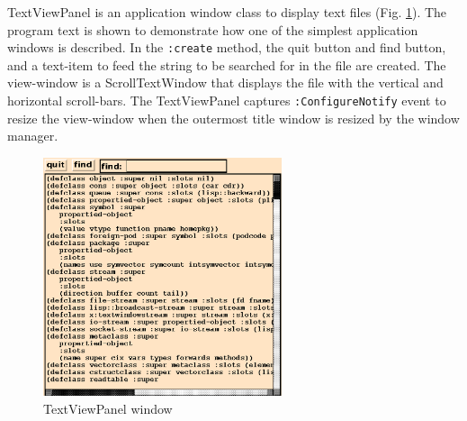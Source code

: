 TextViewPanel is an application window class to display text files
(Fig. \ref{textviewpanel}).
The program text is shown to demonstrate how 
one of the simplest application windows is described.
In the {\tt :create} method, the quit button and find button,
and a text-item to feed the string to be searched for in the file
are created.
The view-window is a ScrollTextWindow that displays the file
with the vertical and horizontal scroll-bars.
The TextViewPanel captures {\tt :ConfigureNotify} event
to resize the view-window when the outermost title window is resized
by the window manager.

\begin{figure}
\begin{center}
\includegraphics[height=7cm]{fig/textviewpanel.ps}
\end{center}
\caption{TextViewPanel window\label{textviewpanel}}
\end{figure}

